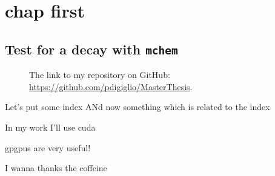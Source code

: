 \documentclass[
	10pt,
	twoside,
	openright,
]{scrbook}
\title{}
\subtitle{}
\author{
  
}
\date{}
\begin{document}
%
\frontmatter
{}
	\maketitle
	\thispagestyle{empty}

	\cleardoublepage
{}
	

	\cleardoublepage
{}
	

	\cleardoublepage
{}
	

	\cleardoublepage
{}
	\tableofcontents

%
\mainmatter
\chapter{chap first}
\lipsum

\section{Test for a decay with \texttt{mchem}}


\begin{figure}
	\centering
\caption{The link to my repository on GitHub: \url{https://github.com/pdigiglio/MasterThesis}.}
\end{figure}


Let's put some index
ANd now something which is related to the index




In my work I'll use \gls{cuda}

\glspl{gpgpu} are very useful!

I wanna thanks the coffeine
%

%
\backmatter
	\printnoidxglossaries

	\cleardoublepage
	\printindex

	\cleardoublepage
	\nocite{*}
	\printbibliography
\end{document}
